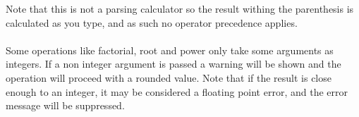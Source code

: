 \documentclass{article}
\begin{document}
	Note that this is not a parsing calculator so the result withing the parenthesis is calculated as you type, and as such no operator precedence applies.\\
	\\
	Some operations like factorial, root and power only take some arguments as integers.
	If a non integer argument is passed a warning will be shown and the operation will proceed with a rounded value. Note that if the result is close enough to an integer, it may be considered a floating point error, and the error message will be suppressed.\\
	\\
	
	
\end{document}
